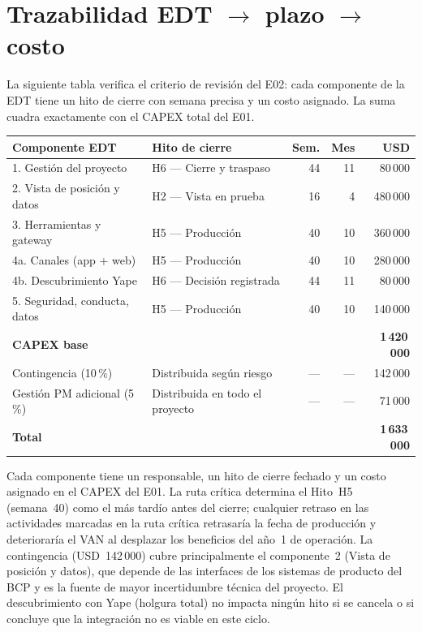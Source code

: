 \documentclass[11pt]{article}
\newcommand{\usd}[1]{USD~#1}
\begin{document}
\section{Trazabilidad EDT \texorpdfstring{$\to$}{->} plazo \texorpdfstring{$\to$}{->} costo}

La siguiente tabla verifica el criterio de revisión del E02: cada componente de la EDT tiene un hito de cierre con semana precisa y un costo asignado. La suma cuadra exactamente con el CAPEX total del E01.

\begin{tabularx}{\textwidth}{@{}X l r r r@{}}
\toprule
\textbf{Componente EDT} & \textbf{Hito de cierre} & \textbf{Sem.} & \textbf{Mes} & \textbf{USD} \\
\midrule
1. Gestión del proyecto       & H6 — Cierre y traspaso        & 44 & 11 &  80\,000 \\
2. Vista de posición y datos  & H2 — Vista en prueba          & 16 &  4 & 480\,000 \\
3. Herramientas y gateway     & H5 — Producción               & 40 & 10 & 360\,000 \\
4a. Canales (app + web)       & H5 — Producción               & 40 & 10 & 280\,000 \\
4b. Descubrimiento Yape       & H6 — Decisión registrada      & 44 & 11 &  80\,000 \\
5. Seguridad, conducta, datos & H5 — Producción               & 40 & 10 & 140\,000 \\
\midrule
\textbf{CAPEX base}           &                               &    &    & \textbf{1\,420\,000} \\
Contingencia (10\,\%)         & Distribuida según riesgo      & —  & —  &  142\,000 \\
Gestión PM adicional (5\,\%)  & Distribuida en todo el proyecto & — & — &   71\,000 \\
\midrule
\textbf{Total}                &                               &    &    & \textbf{1\,633\,000} \\
\bottomrule
\end{tabularx}

Cada componente tiene un responsable, un hito de cierre fechado y un costo asignado en el CAPEX del E01. La ruta crítica determina el Hito~H5 (semana~40) como el más tardío antes del cierre; cualquier retraso en las actividades marcadas en la ruta crítica retrasaría la fecha de producción y deterioraría el VAN al desplazar los beneficios del año~1 de operación. La contingencia (\usd{142\,000}) cubre principalmente el componente~2 (Vista de posición y datos), que depende de las interfaces de los sistemas de producto del BCP y es la fuente de mayor incertidumbre técnica del proyecto. El descubrimiento con Yape (holgura total) no impacta ningún hito si se cancela o si concluye que la integración no es viable en este ciclo.
\end{document}
